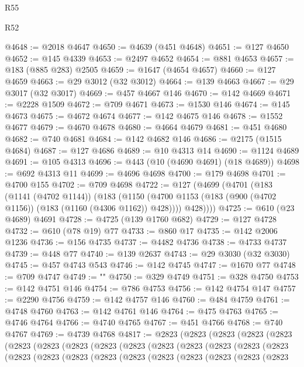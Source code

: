 \begin{lexlean}{R55}
\begin{lexlean}{R52}
\begin{coremodule}
{{{{{{{{{{{{{{{{{{{{{{{{{{{{{{{{{{{{{{{{{{{{{{{{{{{{{{{{{{{{{{{{{{{{{{{{{{{{{{{{{{{{{{{{{{{{{{{{{{{{{{{{{{{{{{{{{{{{{{{{{{{{{{{{{{{{{{{{{{{{{{{{{{{{{{{{{{{{{{{{{{{{{{{{{{{{{{{{{{{{{{{{{{{{{{{{{{{{{{@4648 := @2018 @4647
@4650 := @4639 (@451 @4648)
@4651 := @127 @4650
@4652 := @145 @4339
@4653 := @2497 @4652
@4654 := @881 @4653
@4657 := @183 (@885 @283) @2505
@4659 := @1647 (@4654 @4657)
@4660 := @127 @4659
@4663 := @29 @3012 (@32 @3012)
@4664 := @139 @4663
@4667 := @29 @3017 (@32 @3017)
@4669 := @457 @4667 @146
@4670 := @142 @4669
@4671 := @2228 @1509
@4672 := @709 @4671
@4673 := @1530 @146
@4674 := @145 @4673
@4675 := @4672 @4674
@4677 := @142 @4675 @146
@4678 := @1552 @4677
@4679 := @4670 @4678
@4680 := @4664 @4679
@4681 := @451 @4680
@4682 := @740 @4681
@4684 := @142 @4682 @146
@4686 := @2175 (@1515 @4684)
@4687 := @127 @4686
@4689 := @10 @4313 @14
@4690 := @1124 @4689
@4691 := @105 @4313
@4696 := @443 (@10 (@4690 @4691) (@18 @4689))
@4698 := @692 @4313 @11
@4699 := @4696 @4698
@4700 := @179 @4698
@4701 := @4700 @155
@4702 := @709 @4698
@4722 := @127
    (@4699
      (@4701
        (@183
          (@1141 (@4702 @1144))
          (@183
            (@1150 (@4700 @1153 (@183 (@900 (@4702 @1156)) (@183 (@1160 (@4306 @1162)) @428))))
            @428))))
@4725 := @610 (@23 @4689) @4691
@4728 := @4725 (@139 @1760 @682)
@4729 := @127 @4728
@4732 := @610 (@78 @19) @77
@4733 := @860 @17
@4735 := @142 @2006 @1236
@4736 := @156 @4735
@4737 := @4482 @4736
@4738 := @4733 @4737
@4739 := @448 @77
@4740 := @139 @2637
@4743 := @29 @3030 (@32 @3030)
@4745 := @457 @4743 @543
@4746 := @142 @4745
@4747 := @1670 @77
@4748 := @709 @4747
@4749 := "\n"
@4750 := @329 @4749
@4751 := @328 @4750
@4753 := @142 @4751 @146
@4754 := @786 @4753
@4756 := @142 @4754 @147
@4757 := @2290 @4756
@4759 := @142 @4757 @146
@4760 := @484 @4759
@4761 := @4748 @4760
@4763 := @142 @4761 @146
@4764 := @475 @4763
@4765 := @4746 @4764
@4766 := @4740 @4765
@4767 := @451 @4766
@4768 := @740 @4767
@4769 := @4739 @4768
@4817 := @2823
    (@2823
      (@2823
        (@2823
          (@2823
            (@2823
              (@2823
                (@2823
                  (@2823
                    (@2823
                      (@2823
                        (@2823
                          (@2823
                            (@2823
                              (@2823
                                (@2823
                                  (@2823
                                    (@2823
                                      (@2823
                                        (@2823
                                          (@2823
                                            (@2823
                                              (@2823
                                                (@2823
                                                  (@2823
}}}}}}}}}}}}}}}}}}}}}}}}}}}}}}}}}}}}}}}}}}}}}}}}}}}}}}}}}}}}}}}}}}}}}}}}}}}}}}}}}}}}}}}}}}}}}}}}}}}}}}}}}}}}}}}}}}}}}}}}}}}}}}}}}}}}}}}}}}}}}}}}}}}}}}}}}}}}}}}}}}}}}}}}}}}}}}}}}}}}}}}}}}}}}}}}}}}}}}
\end{coremodule}
\end{lexlean}
\end{lexlean}
